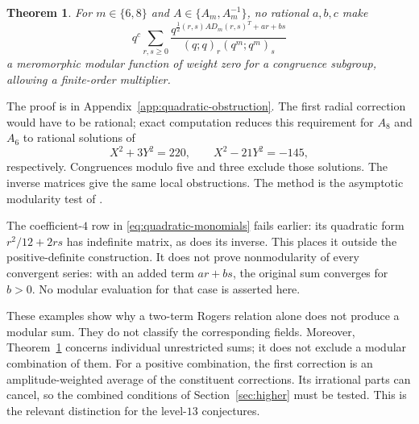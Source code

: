 \documentclass[11pt,reqno]{amsart}
\newtheorem{theorem}{Theorem}[section]
\theoremstyle{remark}
\numberwithin{equation}{section}
\begin{document}
\begin{samepage}
\begin{theorem}\label{thm:quadratic-obstruction}
For $m\in\{6,8\}$ and $A\in\{A_m,A_m^{-1}\}$, no rational
$a,b,c$ make
\[
 q^c\sum_{r,s\geq0}
 \frac{q^{\frac12(r,s)AD_m(r,s)^T+ar+bs}}
 {(q;q)_r(q^m;q^m)_s}
\]
a meromorphic modular function of weight zero for a congruence
subgroup, allowing a finite-order multiplier.
\end{theorem}
\end{samepage}
The proof is in Appendix~\ref{app:quadratic-obstruction}. The first
radial correction would have to be rational; exact computation reduces
this requirement for $A_8$ and $A_6$ to rational solutions of
\[
 X^2+3Y^2=220,\qquad X^2-21Y^2=-145,
\]
respectively. Congruences modulo five and three exclude those solutions.
The inverse matrices give the same local obstructions. The method is
the asymptotic modularity test of \cite{Mizuno,VlasenkoZwegers}.

The coefficient-$4$ row in \eqref{eq:quadratic-monomials} fails earlier:
its quadratic form $r^2/12+2rs$ has indefinite matrix, as does its
inverse. This places it outside the positive-definite construction.
It does not prove nonmodularity of every convergent series: with an
added term $ar+bs$, the original sum converges for $b>0$.
No modular evaluation for that case is asserted here.

These examples show why a two-term Rogers relation alone does not
produce a modular sum. They do not classify the corresponding fields.
Moreover, Theorem~\ref{thm:quadratic-obstruction} concerns individual
unrestricted sums; it does not exclude a modular combination of them.
For a positive combination, the first correction is an amplitude-weighted
average of the constituent corrections. Its irrational parts can cancel,
so the combined conditions of Section~\ref{sec:higher} must be tested.
This is the relevant distinction for the level-$13$ conjectures.
\end{document}
